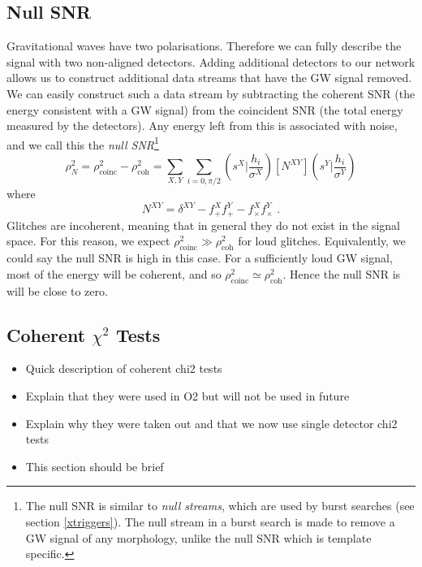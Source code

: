 \documentclass[11pt]{cuthesis}
\newcommand{\fs}{\text{ .}}
\begin{document}
\subsection{Null SNR} \label{sec:null snr}
Gravitational waves have two polarisations. Therefore we can fully describe the signal with two non-aligned detectors. Adding additional detectors to our network allows us to construct additional data streams that have the GW signal removed. We can easily construct such a data stream by subtracting the coherent SNR (the energy consistent with a GW signal) from the coincident SNR (the total energy measured by the detectors). Any energy left from this is associated with noise, and we call this the \textit{null SNR}\footnote{The null SNR is similar to \textit{null streams}, which are used by burst searches (see section \ref{xtriggers}). The null stream in a burst search is made to remove a GW signal of any morphology, unlike the null SNR which is template specific.}
\begin{equation} \label{null snr}
\rho_N^2 = \rho_\text{coinc}^2 - \rho_\text{coh}^2 = \sum_{X,Y} \sum_{i=0,\pi/2} \left( s^X \bigg| \frac{h_i}{\sigma^X} \right) [N^{XY}]  \left( s^Y \bigg| \frac{h_i}{\sigma^Y} \right)
\end{equation} 
where
\begin{equation}
N^{XY} = \delta^{XY} - f^X_{+}f^Y_{+} - f^X_{\times}f^Y_{\times} \fs
\end{equation}
Glitches are incoherent, meaning that in general they do not exist in the signal space. For this reason, we expect $\rho_\text{coinc}^2 \gg \rho_\text{coh}^2$ for loud glitches. Equivalently, we could say the null SNR is high in this case. For a sufficiently loud GW signal, most of the energy will be coherent, and so $\rho_\text{coinc}^2 \simeq \rho_\text{coh}^2$. Hence the null SNR is will be close to zero.

\subsection{Coherent $\chi^2$ Tests} \label{sec:coh chisq}
\begin{itemize}
\item Quick description of coherent chi2 tests
\item Explain that they were used in O2 but will not be used in future
\item Explain why they were taken out and that we now use single detector chi2 tests
\item This section should be brief
\end{itemize}
\end{document}

